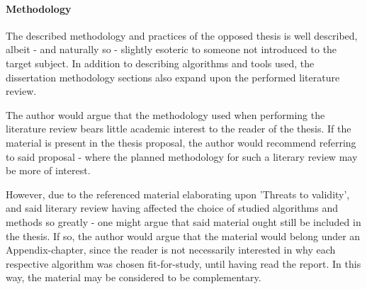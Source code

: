 
\paragraph{Methodology}
\label{par:methodology}
The described methodology and practices of the opposed thesis is well described, albeit - and naturally so - slightly esoteric to someone not introduced to the target subject.
In addition to describing algorithms and tools used, the dissertation methodology sections also expand upon the performed literature review.

The author would argue that the methodology used when performing the literature review bears little academic interest to the reader of the thesis.
If the material is present in the thesis proposal, the author would recommend referring to said proposal - where the planned methodology for such a literary review may be more of interest.

However, due to the referenced material elaborating upon 'Threats to validity', and said literary review having affected the choice of studied algorithms and methods so greatly - one might argue that said material ought still be included in the thesis.
If so, the author would argue that the material would belong under an Appendix-chapter, since the reader is not necessarily interested in why each respective algorithm was chosen fit-for-study, until having read the report.
In this way, the material may be considered to be complementary.